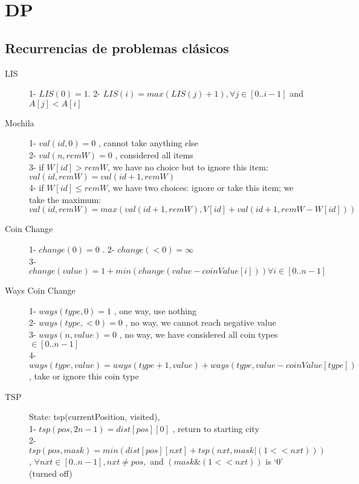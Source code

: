 \chapter{DP}

\section {Recurrencias de problemas clásicos}
\begin{description}
	\item[LIS] 
	1- $LIS(0) = 1$. 
	2- $LIS(i) = max(LIS(j) + 1), \forall j \in [0..i-1]$ and $ A[j] < A[i]$
	
	\item[Mochila]
	1- $val(id, 0) = 0$ , cannot take anything else \\
	2- $val(n, remW) = 0$ , considered all items \\
	3- if $W[id] > remW$, we have no choice but to ignore this item: 
	$val(id, remW) = val(id + 1, remW)$ \\
	4- if $W[id] \le remW$, we have two choices: ignore or take this item; we take the maximum:
	$val(id, remW) = max(val(id + 1, remW), V[id] + val(id + 1, remW - W[id]))$ 
	
	\item[Coin Change]
	1- $change(0) = 0$ . 
	2- $change(< 0) = \infty$  \\ 
	3- $change(value) = 1 + min(change(value - coinValue[i])) \forall i \in [0..n-1]$ 
	
	\item [Ways Coin Change]
	1- $ways(type, 0) = 1$ , one way, use nothing \\
	2- $ways(type, <0) = 0$ , no way, we cannot reach negative value \\ 
	3- $ways(n, value) = 0$ , no way, we have considered all coin types $\in [0..n-1]$ \\ 
	4- $ways(type, value) = ways(type + 1, value) + ways(type, value - coinValue[type]) $ , take or ignore this coin type
	
	\item[TSP]
	State: tsp(currentPosition, visited),  \\
	1- $tsp(pos, 2n-1) = dist[pos][0]$ , return to starting city \\ 2- $tsp(pos, mask) = min(dist[pos][nxt] + tsp(nxt, mask | (1 << nxt))) $, $\forall nxt \in [0..n-1], nxt \neq pos,$ and $(mask \& (1 << nxt))$ is $‘0’$ (turned off)
	
	
\end{description}

